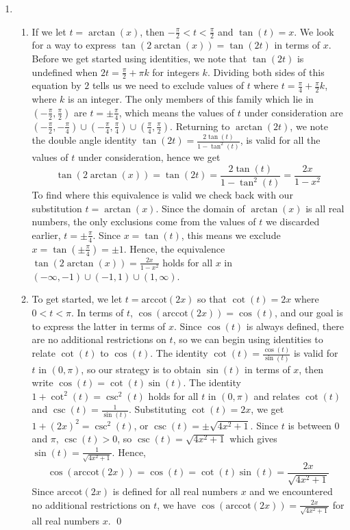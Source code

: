 \begin{ex}
\begin{enumerate}
\item  

\begin{enumerate}

\item If we let $t = \arctan(x)$, then $-\frac{\pi}{2} < t < \frac{\pi}{2}$ and $\tan(t) = x$.   We look for a way to express $\tan(2 \arctan(x)) = \tan(2t)$ in terms of $x$.  Before we get started using identities, we note that $\tan(2t)$ is undefined when $2t = \frac{\pi}{2} + \pi k$ for integers $k$.  Dividing both sides of this equation by $2$ tells us we need to exclude values of $t$ where $t = \frac{\pi}{4} + \frac{\pi}{2} k$, where $k$ is an integer.  The only members of this family which lie in $\left(-\frac{\pi}{2}, \frac{\pi}{2}\right)$ are $t = \pm \frac{\pi}{4}$, which means the values of $t$ under consideration are $\left(-\frac{\pi}{2}, -\frac{\pi}{4}\right) \cup \left(-\frac{\pi}{4}, \frac{\pi}{4}\right) \cup \left(\frac{\pi}{4}, \frac{\pi}{2}\right)$.  Returning to $\arctan(2t)$, we note the double angle identity $\tan(2t) = \frac{2 \tan(t)}{1 - \tan^{2}(t)}$, is valid for all the values of $t$ under consideration, hence we get \[\tan(2 \arctan(x)) = \tan(2t) = \frac{2 \tan(t)}{1 - \tan^{2}(t)}= \frac{2x}{1-x^2}\]  To find where this equivalence is valid we check back with our substitution $t = \arctan(x)$. Since the domain of $\arctan(x)$ is all real numbers, the only exclusions come from the values of $t$ we discarded earlier, $t = \pm \frac{\pi}{4}$.   Since $x =\tan(t)$, this means we exclude $x = \tan\left(\pm \frac{\pi}{4}\right) = \pm 1$.  Hence, the equivalence  $\tan(2 \arctan(x)) =  \frac{2x}{1-x^2}$ holds for all $x$ in  $(-\infty, -1) \cup (-1,1) \cup (1,\infty)$.

\item  To get started, we let $t = \mbox{arccot}(2x)$ so that  $\cot(t) = 2x$ where $0 < t < \pi$.  In terms of $t$, $\cos(\mbox{arccot}(2x)) = \cos(t)$, and our goal is to express the latter in terms of $x$.   Since $\cos(t)$ is always defined, there are no additional restrictions on $t$, so we can begin using identities to relate $\cot(t)$ to $\cos(t)$.  The identity $\cot(t) = \frac{\cos(t)}{\sin(t)}$ is valid for $t$ in $(0,\pi)$, so our strategy is to obtain $\sin(t)$ in terms of $x$, then write $\cos(t) = \cot(t) \sin(t)$.   The identity $1 + \cot^{2}(t) = \csc^{2}(t)$ holds for all $t$ in $(0,\pi)$ and relates $\cot(t)$ and $\csc(t) = \frac{1}{\sin(t)}$.  Substituting $\cot(t) =2x$, we get  $1 + (2x)^2 = \csc^{2}(t)$, or $\csc(t) =  \pm \sqrt{4x^2+1}$. Since $t$ is between $0$ and $\pi$, $\csc(t) > 0$, so $\csc(t) =\sqrt{4x^2+1}$ which gives $\sin(t) = \frac{1}{\sqrt{4x^2+1}}$. Hence, \[\cos(\mbox{arccot}(2x)) = \cos(t) = \cot(t) \sin(t) = \frac{2x}{\sqrt{4x^2+1}}\]   Since $\mbox{arccot}(2x)$ is defined for all real numbers $x$ and we encountered no additional restrictions on $t$, we have  $\cos\left(\mbox{arccot}(2x)\right) = \frac{2x}{\sqrt{4x^2+1}}$ for all real numbers $x$. \qed

\end{enumerate}

\end{enumerate}

\end{ex}

